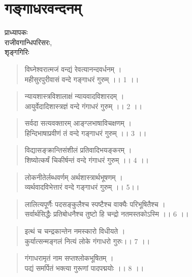 \chapter{गङ्गाधरवन्दनम्}

\begin{center}
\smallskip

प्राध्यापकः\\
राजीवगान्धिपरिसरः,\\
शृङ्गगिरिः
\end{center}

\begin{verse}
विघ्नेश्वरात्मजं वन्द्यं  रेवत्यानन्दवर्धनम् ।\\
महीसुरपुरीवासं वन्दे गङ्गाधरं गुरुम् ।। 1 ।।
\end{verse}

\begin{verse}
न्यायशास्त्रविशालाक्षं न्यायवादविशारदम् ।\\
आयुर्वेदादिशास्त्रज्ञं वन्दे गंगाधरं गुरुम् ।। 2 ।।
\end{verse}

\begin{verse}
सर्वदा सत्यवक्तारम् आङ्ग्लभाषाविचक्षणम् ।\\
हिन्दिभाषाप्रवीणं तं वन्दे गङ्गाधरं गुरुम् ।। 3 ।।
\end{verse}

\begin{verse}
विद्यासङ्क्रान्तिसंशीलं प्रतिवादिभयङ्करम् ।\\
शिष्योत्कर्षं चिकीर्षन्तं वन्दे गंगाधरं गुरुम् ।। 4 ।।
\end{verse}

\begin{verse}
लोकनीतेर्लब्धवर्णम् अर्थशास्त्रार्थभूषणम् ।\\
व्यर्थवादविभेत्तारं वन्दे गङ्गाधरं गुरुम् ।। 5।।
\end{verse}

\begin{verse}
लालित्यपूर्णैः पदसङ्कुलैश्च स्पष्टैश्च वाक्यैः परिभूषितैश्च ।\\
सर्वार्थसिद्धैः प्रतिबोधनैश्च तुष्टो हि चन्द्रो नतमस्तकोऽस्मि ।। 6 ।।
\end{verse}

\begin{verse}
इत्थं च चन्द्रकान्तेन नमस्कारो विधीयते ।\\
कुर्यात्सन्मङ्गलं नित्यं लोके गंगाधरो गुरुः।। 7 ।।
\end{verse}

\begin{verse}
गंगाधरामृतं नाम सप्तश्लोकभूषितम्  ।\\
पद्यं समर्पितं भक्त्या गुरूणां पादपद्मयोः ।। 8 ।।
\end{verse}

